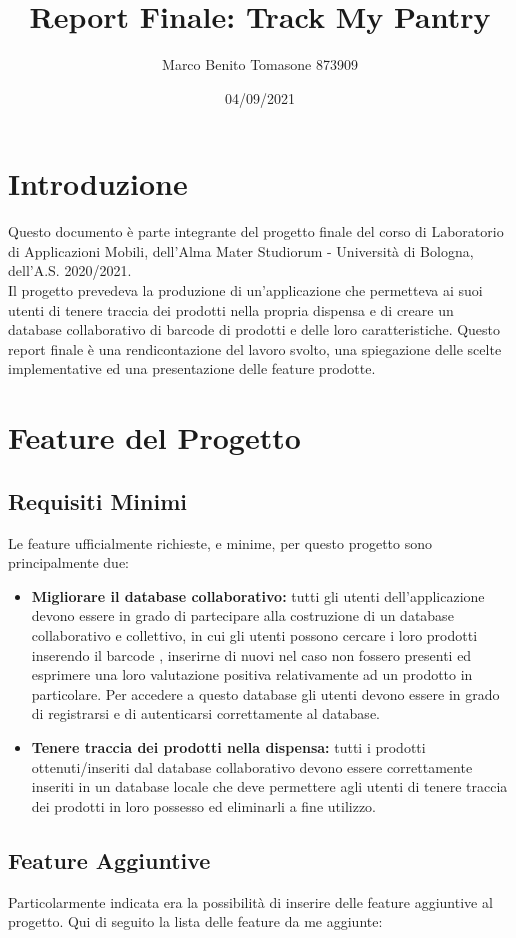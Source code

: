 \documentclass[12pt]{article}
\title{Report Finale: Track My Pantry}
\author{Marco Benito Tomasone 873909}
\date{04/09/2021}
\begin{document}
\maketitle
\section{Introduzione}
    Questo documento è parte integrante del progetto finale del corso di Laboratorio di Applicazioni Mobili, dell'Alma Mater Studiorum - 
    Università di Bologna, dell'A.S. 2020/2021. \\
    Il progetto prevedeva la produzione di un'applicazione che permetteva ai suoi utenti di tenere traccia dei prodotti nella propria dispensa 
    e di creare un database collaborativo di barcode di prodotti e delle loro caratteristiche.
    Questo report finale è una rendicontazione del lavoro svolto, una spiegazione delle scelte implementative ed una presentazione delle 
    feature prodotte.
\section{Feature del Progetto}
\subsection{Requisiti Minimi}
    Le feature ufficialmente richieste, e minime, per questo progetto sono principalmente due:
    \begin{itemize}
        \item \textbf{Migliorare il database collaborativo: } tutti gli utenti dell'applicazione devono essere in grado di partecipare alla
        costruzione di un database collaborativo e collettivo, in cui gli utenti possono cercare i loro prodotti inserendo il barcode , inserirne
        di nuovi nel caso non fossero presenti ed esprimere una loro valutazione positiva relativamente ad un prodotto in particolare. Per 
        accedere a questo database gli utenti devono essere in grado di registrarsi e di autenticarsi correttamente al database.
        \item \textbf{Tenere traccia dei prodotti nella dispensa: } tutti i prodotti ottenuti/inseriti dal database collaborativo devono essere correttamente
        inseriti in un database locale che deve permettere agli utenti di tenere traccia dei prodotti in loro possesso ed eliminarli a fine utilizzo.
    \end{itemize}
\subsection{Feature Aggiuntive}
    Particolarmente indicata era la possibilità di inserire delle feature aggiuntive al progetto. Qui di seguito la lista delle feature da me aggiunte:
\end{document}
